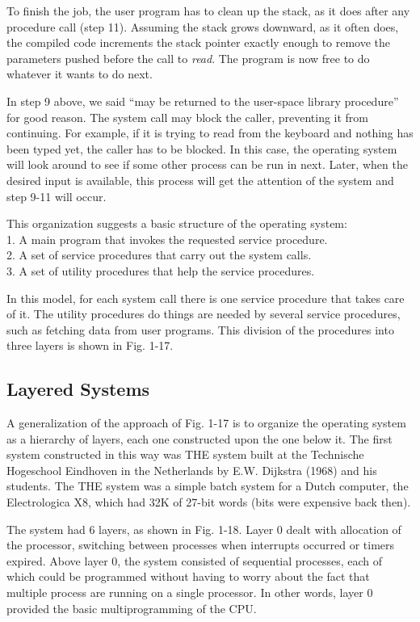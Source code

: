 \documentclass{book}
\newcommand {\sys} [1] {\textsl{#1}}
\begin{document}
To finish the job, the user program has to clean up the stack, as it does after any procedure call (step 11).
Assuming the stack grows downward, as it often does, 
the compiled code increments the stack pointer exactly enough to remove the parameters pushed before the call to \sys{read}.
The program is now free to do whatever it wants to do next.

In step 9 above, we said ``may be returned to the user-space library procedure'' for good reason.
The system call may block the caller, preventing it from continuing.
For example, if it is trying to read from the keyboard and nothing has been typed yet, the caller has to be blocked.
In this case, the operating system will look around to see if some other process can be run in next.
Later, when the desired input is available, this process will get the attention of the system and step 9-11 will occur.

This organization suggests a basic structure of the operating system:\\
1. A main program that invokes the requested service procedure.\\
2. A set of service procedures that carry out the system calls.\\
3. A set of utility procedures that help the service procedures.

In this model, for each system call there is one service procedure that takes care of it.
The utility procedures do things are needed by several service procedures, such as fetching data from user programs.
This division of the procedures into three layers is shown in Fig. 1-17.

\subsection{Layered Systems}
A generalization of the approach of Fig. 1-17 is to organize the operating system as a hierarchy of layers,
each one constructed upon the one below it.
The first system constructed in this way was THE system 
built at the Technische Hogeschool Eindhoven in the Netherlands by E.W. Dijkstra (1968) and his students.
The THE system was a simple batch system for a Dutch computer, the Electrologica X8,
which had 32K of 27-bit words (bits were expensive back then).

The system had 6 layers, as shown in Fig. 1-18.
Layer 0 dealt with allocation of the processor, switching between processes when interrupts occurred or timers expired.
Above layer 0, the system consisted of sequential processes, each of which could be programmed without having to worry about the fact 
that multiple process are running on a single processor.
In other words, layer 0 provided the basic multiprogramming of the CPU.
\end{document}
